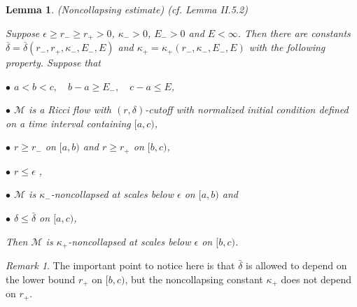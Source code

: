 \documentclass[12pt]{amsart}
\newcommand{\M}{{\mathcal M}}
\newcommand{\de}{\delta}
\newcommand{\eps}{\epsilon}
\numberwithin{equation}{section}
\theoremstyle{plain}
\newtheorem{lemma}[equation]{Lemma}
\theoremstyle{definition}
\theoremstyle{remark}
\newtheorem{remark}[equation]{Remark}
\begin{document}
\begin{lemma}(Noncollapsing estimate) (cf. Lemma II.5.2)
\label{II.5.2}

Suppose $\epsilon \ge r_- \ge r_+ >0$, $\kappa_->0$, $E_->0$ and $E<\infty$.
Then there are constants $\overline{\delta} =
\overline{\delta}(r_-,r_+,\kappa_-,E_-,E)$
and $\kappa_+=\kappa_+(r_-,\kappa_-,E_-,E)$ with
the following property.  Suppose that

$\bullet$  $a<b<c,\quad b-a\geq E_-,\quad c-a\leq E$,

$\bullet$  $\M$ is a Ricci flow with $(r,\de)$-cutoff
with normalized initial condition
defined on a time interval containing $[a,c)$, 

$\bullet$ $r\geq r_-$ on $[a,b)$ and $r\geq r_+$ on $[b,c)$, 

$\bullet$ $r \le \epsilon$ ,

$\bullet$ $\M$ is $\kappa_-$-noncollapsed at scales below
$\eps$ on $[a,b)$ and

$\bullet$ $\de\leq \bar\de$ on $[a,c)$,


Then $\M$ is $\kappa_+$-noncollapsed at scales below $\eps$
on $[b,c)$.
\end{lemma}
\begin{remark}
The important point to notice here is that $\bar\de$ is allowed
to depend on the lower bound $r_+$ on $[b,c)$, but the 
noncollapsing constant $\kappa_+$ does not depend on $r_+$.
\end{remark}
\end{document}
